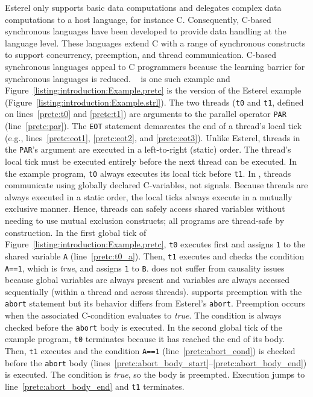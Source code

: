 Esterel only supports basic data computations and delegates
complex data computations to a host language, for instance C. Consequently, 
C-based synchronous languages have been developed to provide
data handling at the language level. These languages
extend C with a range of synchronous constructs to support
concurrency, preemption, and thread communication. C-based 
synchronous languages appeal to C programmers because the 
learning barrier for synchronous languages is reduced. 
\pretc{}~\cite{pret_pretc} is one such example and
Figure~\ref{listing:introduction:Example.pretc} is the
\pretc{} version of the Esterel example
(Figure~\ref{listing:introduction:Example.strl}). The two
threads (\verb$t0$ and \verb$t1$, defined on
lines~\ref{pretc:t0} and \ref{pretc:t1}) are arguments to
the parallel operator \verb$PAR$ (line~\ref{pretc:par}).
The \verb$EOT$ statement demarcates the end of a thread's
local tick (e.g., lines~\ref{pretc:eot1}, \ref{pretc:eot2},
and \ref{pretc:eot3}). Unlike Esterel, threads in the
\verb$PAR$'s argument are executed in a left-to-right
(static) order. The thread's local tick must be executed
entirely before the next thread can be executed. In the
example program, \verb$t0$ always executes its local tick
before \verb$t1$. In \pretc{}, threads communicate using
globally declared C-variables, not signals. Because
threads are always executed in a static order, the
local ticks always execute in a mutually exclusive manner. 
Hence, threads can safely access shared variables
without needing to use mutual exclusion constructs; all
\pretc{} programs are thread-safe by construction. In
the first global tick of Figure~\ref{listing:introduction:Example.pretc}, 
\verb$t0$ executes first and assigns \verb$1$ to the shared variable
\verb$A$ (line~\ref{pretc:t0_a}). Then, \verb$t1$ executes 
and checks the condition \verb$A==1$, which is \emph{true}, and assigns
\verb$1$ to \verb$B$. \pretc{} does not suffer from causality
issues because global variables are always present and
variables are always accessed sequentially (within a thread and
across threads). \pretc{} supports preemption with the
\verb$abort$ statement but its behavior differs from
Esterel's \verb$abort$. Preemption occurs when the associated
C-condition evaluates to \emph{true}. The condition is
always checked before the \verb$abort$ body is executed. In 
the second global tick of the example program,
\verb$t0$ terminates because it has reached the end of its
body. Then, \verb$t1$ executes and the condition \verb$A==1$
(line~\ref{pretc:abort_cond}) is checked before the
\verb$abort$ body
(lines~\ref{pretc:abort_body_start}--\ref{pretc:abort_body_end}) 
is executed. The condition is \emph{true}, so the body is
preempted. Execution jumps to line~\ref{pretc:abort_body_end} 
and \verb$t1$ terminates. 


